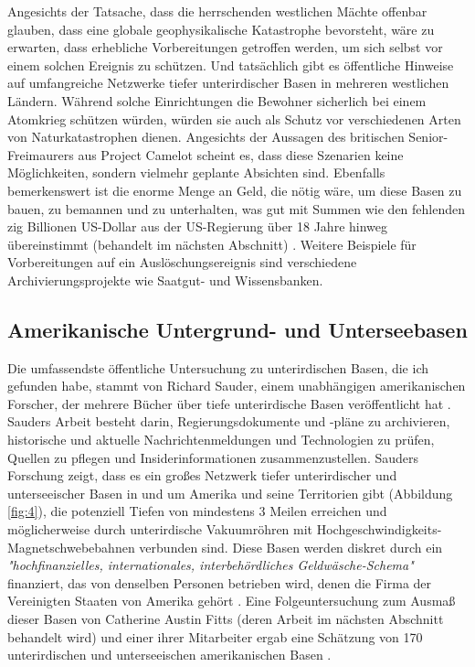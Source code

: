 \documentclass[10pt,twocolumn,letterpaper]{article}
\begin{document}
Angesichts der Tatsache, dass die herrschenden westlichen Mächte offenbar glauben, dass eine globale geophysikalische Katastrophe bevorsteht, wäre zu erwarten, dass erhebliche Vorbereitungen getroffen werden, um sich selbst vor einem solchen Ereignis zu schützen. Und tatsächlich gibt es öffentliche Hinweise auf umfangreiche Netzwerke tiefer unterirdischer Basen in mehreren westlichen Ländern. Während solche Einrichtungen die Bewohner sicherlich bei einem Atomkrieg schützen würden, würden sie auch als Schutz vor verschiedenen Arten von Naturkatastrophen dienen. Angesichts der Aussagen des britischen Senior-Freimaurers aus Project Camelot \cite{4,6} scheint es, dass diese Szenarien keine Möglichkeiten, sondern vielmehr geplante Absichten sind. Ebenfalls bemerkenswert ist die enorme Menge an Geld, die nötig wäre, um diese Basen zu bauen, zu bemannen und zu unterhalten, was gut mit Summen wie den fehlenden zig Billionen US-Dollar aus der US-Regierung über 18 Jahre hinweg übereinstimmt (behandelt im nächsten Abschnitt) \cite{11,12,13}. Weitere Beispiele für Vorbereitungen auf ein Auslöschungsereignis sind verschiedene Archivierungsprojekte wie Saatgut- und Wissensbanken.

\subsection{Amerikanische Untergrund- und Unterseebasen}

Die umfassendste öffentliche Untersuchung zu unterirdischen Basen, die ich gefunden habe, stammt von Richard Sauder, einem unabhängigen amerikanischen Forscher, der mehrere Bücher über tiefe unterirdische Basen veröffentlicht hat \cite{22}. Sauders Arbeit besteht darin, Regierungsdokumente und -pläne zu archivieren, historische und aktuelle Nachrichtenmeldungen und Technologien zu prüfen, Quellen zu pflegen und Insiderinformationen zusammenzustellen. Sauders Forschung zeigt, dass es ein großes Netzwerk tiefer unterirdischer und unterseeischer Basen in und um Amerika und seine Territorien gibt (Abbildung \ref{fig:4}), die potenziell Tiefen von mindestens 3 Meilen erreichen und möglicherweise durch unterirdische Vakuumröhren mit Hochgeschwindigkeits-Magnetschwebebahnen verbunden sind. Diese Basen werden diskret durch ein \textit{"hochfinanzielles, internationales, interbehördliches Geldwäsche-Schema"} finanziert, das von denselben Personen betrieben wird, denen die Firma der Vereinigten Staaten von Amerika gehört \cite{22}. Eine Folgeuntersuchung zum Ausmaß dieser Basen von Catherine Austin Fitts (deren Arbeit im nächsten Abschnitt behandelt wird) und einer ihrer Mitarbeiter ergab eine Schätzung von 170 unterirdischen und unterseeischen amerikanischen Basen \cite{16,20}.
\end{document}
